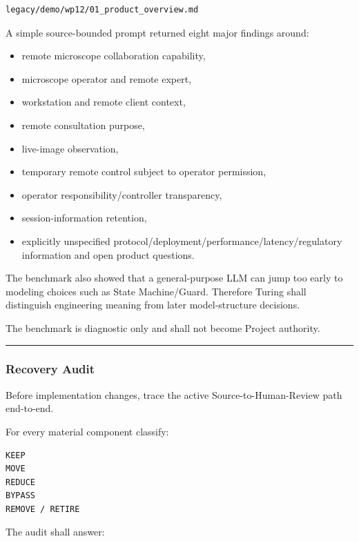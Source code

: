 \begin{verbatim}
legacy/demo/wp12/01_product_overview.md
\end{verbatim}

A simple source-bounded prompt returned eight major findings around:

\begin{itemize}
\tightlist
\item
  remote microscope collaboration capability,
\item
  microscope operator and remote expert,
\item
  workstation and remote client context,
\item
  remote consultation purpose,
\item
  live-image observation,
\item
  temporary remote control subject to operator permission,
\item
  operator responsibility/controller transparency,
\item
  session-information retention,
\item
  explicitly unspecified protocol/deployment/performance/latency/regulatory information and open product questions.
\end{itemize}

The benchmark also showed that a general-purpose LLM can jump too early to modeling choices such as State Machine/Guard. Therefore Turing shall distinguish engineering meaning from later model-structure decisions.

The benchmark is diagnostic only and shall not become Project authority.

\begin{center}\rule{0.5\linewidth}{0.5pt}\end{center}

\hypertarget{recovery-audit}{%
\subsubsection{Recovery Audit}\label{recovery-audit}}

Before implementation changes, trace the active Source-to-Human-Review path end-to-end.

For every material component classify:

\begin{verbatim}
KEEP
MOVE
REDUCE
BYPASS
REMOVE / RETIRE
\end{verbatim}

The audit shall answer:

